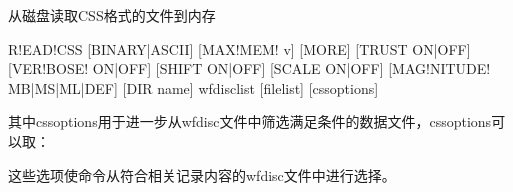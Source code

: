 \label{cmd:readcss}

从磁盘读取CSS格式的文件到内存

\begin{SACSTX}
R!EAD!CSS [BINARY|ASCII] [MAX!MEM! v] [MORE] [TRUST ON|OFF]
    [VER!BOSE! ON|OFF] [SHIFT ON|OFF] [SCALE ON|OFF]
    [MAG!NITUDE! MB|MS|ML|DEF] [DIR name] wfdisclist [filelist]
    [cssoptions]
\end{SACSTX}
其中cssoptions用于进一步从wfdisc文件中筛选满足条件的数据文件，cssoptions可以取：
\begin{SACSTX}
\end{SACSTX}

这些选项使命令从符合相关记录内容的wfdisc文件中进行选择。

